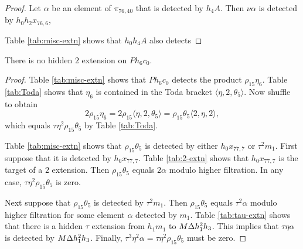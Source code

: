 \begin{proof}
Let $\alpha$ be an element of $\pi_{76,40}$ that is detected by
$h_4 A$.  Then $\nu \alpha$ is detected by $h_0 h_2 x_{76,6}$,

Table \ref{tab:misc-extn} shows that
$h_0 h_4 A$ also detects 
\end{proof}

\begin{lemma}
\label{lem:2-Ph6c0}
There is no hidden $2$ extension on $P h_6 c_0$.
\end{lemma}

\begin{proof}
Table \ref{tab:misc-extn} shows that
$P h_6 c_0$ detects the product $\rho_{15} \eta_6$.
Table \ref{tab:Toda} shows that 
$\eta_6$ is contained in the Toda bracket
$\langle \eta, 2, \theta_5 \rangle$.
Now shuffle to obtain
\[
2 \rho_{15} \eta_6 =
2 \rho_{15} \langle \eta, 2, \theta_5 \rangle =
\rho_{15} \theta_5 \langle 2, \eta, 2 \rangle,
\]
which equals $\tau \eta^2 \rho_{15} \theta_5$ by 
Table \ref{tab:Toda}.

Table \ref{tab:misc-extn} shows that
$\rho_{15} \theta_5$ is detected by either
$h_0 x_{77,7}$ or $\tau^2 m_1$.
First suppose that it is detected by $h_0 x_{77,7}$.
Table \ref{tab:2-extn} shows that $h_0 x_{77,7}$ is the target
of a $2$ extension.
Then $\rho_{15} \theta_5$ equals $2 \alpha$ modulo
higher filtration.
In any case,
$\tau \eta^2 \rho_{15} \theta_5$ is zero.

Next suppose that $\rho_{15} \theta_5$ is detected by
$\tau^2 m_1$.
Then $\rho_{15} \theta_5$ equals $\tau^2 \alpha$ modulo
higher filtration for some element $\alpha$ detected by $m_1$.
Table \ref{tab:tau-extn}
shows that there is a hidden $\tau$ extension from $h_1 m_1$
to $M \Delta h_1^2 h_3$.  This implies that
$\tau \eta \alpha$ is detected by $M \Delta h_1^2 h_3$.
Finally,
$\tau^3 \eta^2 \alpha = \tau \eta^2 \rho_{15} \theta_5$
must be zero.
\end{proof}

